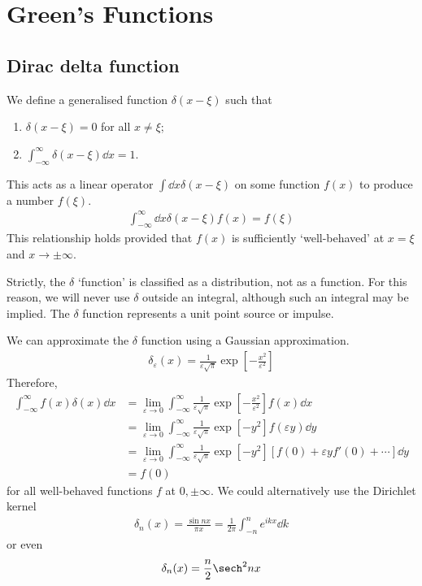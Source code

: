 \section{Green's Functions}

\subsection{Dirac delta function}
\begin{definition}
	We define a generalised function $\delta(x - \xi)$ such that
	\begin{enumerate}
		\item $\delta(x-\xi) = 0$ for all $x \neq \xi$;
		\item $\int_{-\infty}^\infty \delta(x-\xi) \dd{x} = 1$.
	\end{enumerate}
	This acts as a linear operator $\int \dd{x} \delta(x - \xi)$ on some function $f(x)$ to produce a number $f(\xi)$.
	\begin{align*}
		\int_{-\infty}^\infty \dd{x} \delta(x-\xi) f(x) = f(\xi)
	\end{align*}
	This relationship holds provided that $f(x)$ is sufficiently `well-behaved' at $x=\xi$ and $x\to\pm \infty$.
\end{definition}
\begin{remark}
	Strictly, the $\delta$ `function' is classified as a distribution, not as a function.
	For this reason, we will never use $\delta$ outside an integral, although such an integral may be implied.
	The $\delta$ function represents a unit point source or impulse.
\end{remark}
We can approximate the $\delta$ function using a Gaussian approximation.
\begin{align*}
	\delta_\varepsilon(x) = \frac{1}{\varepsilon \sqrt{\pi}} \exp[-\frac{x^2}{\varepsilon^2}]
\end{align*}
Therefore,
\begin{align*}
	\int_{-\infty}^\infty f(x) \delta(x) \dd{x} & = \lim_{\varepsilon \to 0} \int_{-\infty}^\infty \frac{1}{\varepsilon \sqrt{\pi}} \exp[-\frac{x^2}{\varepsilon^2}] f(x) \dd{x} \\
    & = \lim_{\varepsilon \to 0} \int_{-\infty}^\infty \frac{1}{\varepsilon \sqrt{\pi}} \exp[-y^2] f(\varepsilon y) \dd{y} \\
    & = \lim_{\varepsilon \to 0} \int_{-\infty}^\infty \frac{1}{\varepsilon \sqrt{\pi}} \exp[-y^2] [f(0) + \varepsilon y f'(0) + \cdots] \dd{y} \\
    & = f(0)
\end{align*}
for all well-behaved functions $f$ at $0, \pm \infty$.
We could alternatively use the Dirichlet kernel
\begin{align*}
	\delta_n(x) = \frac{\sin n x}{\pi x} = \frac{1}{2\pi} \int_{-n}^n e^{ikx} \dd{k}
\end{align*}
or even
\begin{align*}
	\delta_n(x) = \frac{n}{2} \sech^2 nx
\end{align*}

